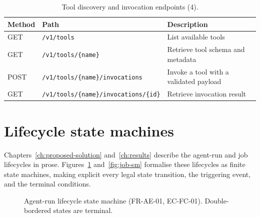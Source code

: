 \documentclass[a4paper]{sapthesis}
\begin{document}
\begin{table}[ht]
\centering
\caption{Tool discovery and invocation endpoints (4).}
\label{tab:app-tool-ep}
\small
\begin{tabularx}{\textwidth}{@{}l l X@{}}
    \hline
    \textbf{Method} & \textbf{Path} & \textbf{Description} \\
    \hline
    GET  & \texttt{/v1/tools}                              & List available tools \\
    GET  & \texttt{/v1/tools/\{name\}}                     & Retrieve tool schema and metadata \\
    POST & \texttt{/v1/tools/\{name\}/invocations}         & Invoke a tool with a validated payload \\
    GET  & \texttt{/v1/tools/\{name\}/invocations/\{id\}}  & Retrieve invocation result \\
    \hline
\end{tabularx}
\end{table}


\section{Lifecycle state machines}
\label{app:extra-diagrams}

Chapters~\ref{ch:proposed-solution} and~\ref{ch:results} describe the
agent-run and job lifecycles in prose.
Figures~\ref{fig:run-sm} and~\ref{fig:job-sm} formalise these
lifecycles as finite state machines, making explicit every legal state
transition, the triggering event, and the terminal conditions.

\begin{figure}[ht]
\centering
{}
\caption{Agent-run lifecycle state machine (FR-AE-01, EC-FC-01).
    Double-bordered states are terminal.}
\label{fig:run-sm}
\end{figure}
\end{document}
